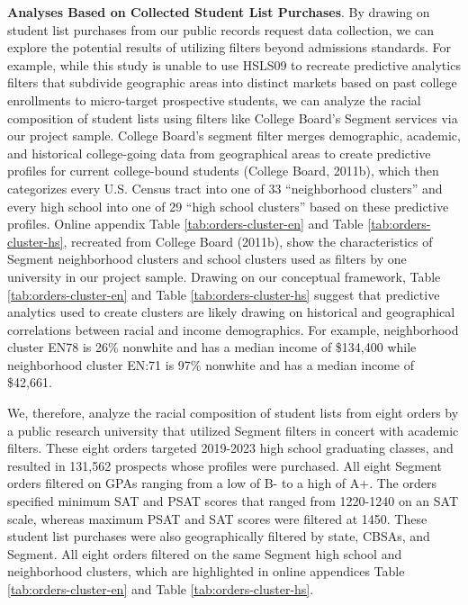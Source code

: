 \documentclass[
  12pt,
]{article}
\begin{document}
\textbf{Analyses Based on Collected Student List Purchases}. By drawing on student list purchases from our public records request data collection, we can explore the potential results of utilizing filters beyond admissions standards. For example, while this study is unable to use HSLS09 to recreate predictive analytics filters that subdivide geographic areas into distinct markets based on past college enrollments to micro-target prospective students, we can analyze the racial composition of student lists using filters like College Board's Segment services via our project sample. College Board's segment filter merges demographic, academic, and historical college-going data from geographical areas to create predictive profiles for current college-bound students (College Board, 2011b), which then categorizes every U.S. Census tract into one of 33 ``neighborhood clusters'' and every high school into one of 29 ``high school clusters'' based on these predictive profiles. Online appendix Table \ref{tab:orders-cluster-en} and Table \ref{tab:orders-cluster-hs}, recreated from College Board (2011b), show the characteristics of Segment neighborhood clusters and school clusters used as filters by one university in our project sample. Drawing on our conceptual framework, Table \ref{tab:orders-cluster-en} and Table \ref{tab:orders-cluster-hs} suggest that predictive analytics used to create clusters are likely drawing on historical and geographical correlations between racial and income demographics. For example, neighborhood cluster EN78 is 26\% nonwhite and has a median income of \$134,400 while neighborhood cluster EN:71 is 97\% nonwhite and has a median income of \$42,661.

We, therefore, analyze the racial composition of student lists from eight orders by a public research university that utilized Segment filters in concert with academic filters. These eight orders targeted 2019-2023 high school graduating classes, and resulted in 131,562 prospects whose profiles were purchased. All eight Segment orders filtered on GPAs ranging from a low of B- to a high of A+. The orders specified minimum SAT and PSAT scores that ranged from 1220-1240 on an SAT scale, whereas maximum PSAT and SAT scores were filtered at 1450. These student list purchases were also geographically filtered by state, CBSAs, and Segment. All eight orders filtered on the same Segment high school and neighborhood clusters, which are highlighted in online appendices Table \ref{tab:orders-cluster-en} and Table \ref{tab:orders-cluster-hs}.
\end{document}
